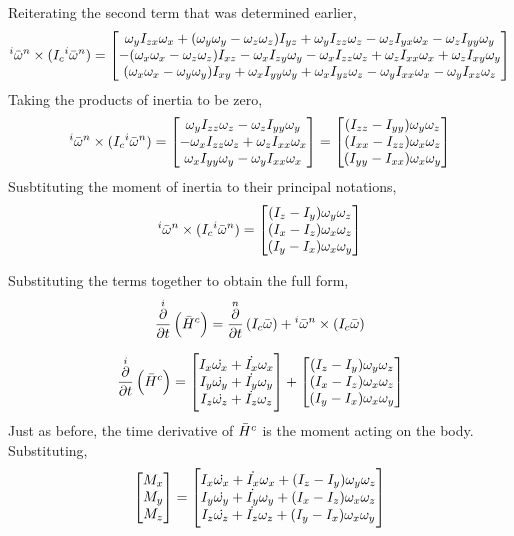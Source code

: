 \documentclass[class=report, 12pt, crop=false]{standalone}
\begin{document}
\begin{center}
Reiterating the second term that was determined earlier,
$${}^i\bar{\omega}^n\times (I_c {}^i\bar{\omega}^n) = \begin{bmatrix}
\omega_yI_{zx}\omega_x + (\omega_y\omega_y - \omega_z\omega_z)I_{yz} + \omega_yI_{zz}\omega_z - \omega_zI_{yx}\omega_x - \omega_zI_{yy}\omega_y \\
-(\omega_x\omega_x - \omega_z\omega_z)I_{xz} - \omega_xI_{zy}\omega_y - \omega_xI_{zz}\omega_z + \omega_zI_{xx}\omega_x + \omega_zI_{xy}\omega_y \\
(\omega_x\omega_x - \omega_y\omega_y)I_{xy} + \omega_xI_{yy}\omega_y + \omega_xI_{yz}\omega_z - \omega_yI_{xx}\omega_x  - \omega_yI_{xz}\omega_z
\end{bmatrix}$$
Taking the products of inertia to be zero,
$${}^i\bar{\omega}^n\times (I_c {}^i\bar{\omega}^n) = \begin{bmatrix}
\omega_yI_{zz}\omega_z - \omega_zI_{yy}\omega_y \\
 - \omega_xI_{zz}\omega_z + \omega_zI_{xx}\omega_x \\
\omega_xI_{yy}\omega_y - \omega_yI_{xx}\omega_x
\end{bmatrix} = \begin{bmatrix}
(I_{zz} - I_{yy})\omega_y\omega_z \\
(I_{xx} - I_{zz})\omega_x\omega_z \\
(I_{yy} - I_{xx})\omega_x\omega_y
\end{bmatrix}$$ 
Susbtituting the moment of inertia to their principal notations,
$${}^i\bar{\omega}^n\times (I_c {}^i\bar{\omega}^n)= \begin{bmatrix}
(I_{z} - I_{y})\omega_y\omega_z \\
(I_{x} - I_{z})\omega_x\omega_z \\
(I_{y} - I_{x})\omega_x\omega_y
\end{bmatrix}$$

Substituting the terms together to obtain the full form,
$$\overset{i}{\frac{\partial}{\partial t}}\left(\bar{H}^c\right) = \overset{n}{\frac{\partial}{\partial t}}\left(I_c \bar{\omega}\right) + {}^i\bar{\omega}^n\times (I_c \bar{\omega})$$

$$\overset{i}{\frac{\partial}{\partial t}}\left(\bar{H}^c\right) = 
\begin{bmatrix}
I_x\dot{\omega_x}+\dot{I_x}\omega_x \\
I_y\dot{\omega_y}+\dot{I_y}\omega_y \\
I_z\dot{\omega_z}+\dot{I_z}\omega_z
\end{bmatrix} + \begin{bmatrix}
(I_{z} - I_{y})\omega_y\omega_z \\
(I_{x} - I_{z})\omega_x\omega_z \\
(I_{y} - I_{x})\omega_x\omega_y
\end{bmatrix}$$
Just as before, the time derivative of $\bar{H}^c$ is the moment acting on the body. Substituting,
$$\begin{bmatrix}
M_x \\ M_y \\ M_z
\end{bmatrix} = \begin{bmatrix}
I_x\dot{\omega_x}+\dot{I_x}\omega_x + (I_{z} - I_{y})\omega_y\omega_z\\
I_y\dot{\omega_y}+\dot{I_y}\omega_y + (I_{x} - I_{z})\omega_x\omega_z\\
I_z\dot{\omega_z}+\dot{I_z}\omega_z + (I_{y} - I_{x})\omega_x\omega_y
\end{bmatrix}$$









\end{center}
\end{document}
